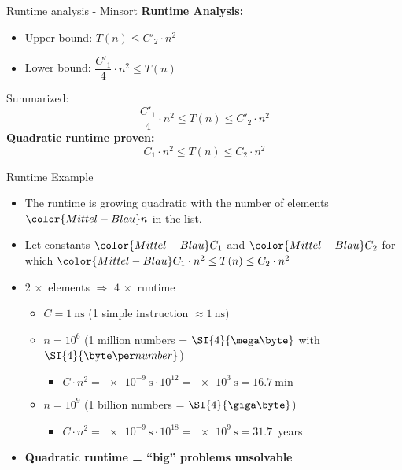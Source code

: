 \begin{frame}{Runtime analysis - Minsort}
  \textbf{Runtime Analysis:}
  \begin{itemize}
    \item
      {\color{MainB}Upper bound}:
      \hspace{1.5em} $T(n) \leq C'_2 \cdot n^2$
    \item
      {\color{MainB}Lower bound}:
      \hspace{1.5em} $\dfrac{C'_1}{4} \cdot n^2 \leq T(n)$
  \end{itemize}
  \begin{block}{Summarized:}
    \begin{displaymath}
      \frac{C'_1}{4} \cdot n^2 \leq T(n) \leq C'_2 \cdot n^2
    \end{displaymath}
    \textbf{Quadratic runtime proven:}
    \begin{displaymath}
      C_1 \cdot n^2 \leq T(n) \leq C_2 \cdot n^2
    \end{displaymath}
  \end{block}
\end{frame}


\begin{frame}{Runtime Example}
  \begin{itemize}
    \item
      The runtime is growing quadratic with the number of elements
      ${\color{Mittel-Blau}n}$ in the list.\\
    \item
      Let constants $\color{Mittel-Blau}C_1$ and $\color{Mittel-Blau}C_2$
      for which $\color{Mittel-Blau}C_1 \cdot n^2 \leq T(n) \leq C_2 \cdot n^2$
    \item
      $2\, \times$ elements $\Rightarrow$ $4\, \times$ runtime\\
      \begin{itemize}
        \item
          $C = \SI{1}{\nano\second}$
          (1 simple instruction $\approx \SI{1}{\nano\second}$)
        \item
          $n = 10^6$ (1 million numbers = $\SI{4}{\mega\byte}$
          with $\SI{4}{\byte\per number}$)
          \begin{itemize}
            \item
              $C \cdot n^2 = \SI{e-9}{\second} \cdot 10^{12}
              = \SI{e3}{\second} = \SI{16.7}{\minute}$
          \end{itemize}
        \item
          $n = 10^9$ (1 billion numbers = $\SI{4}{\giga\byte}$)
          \begin{itemize}
            \item
              $C \cdot n^2 = \SI{e-9}{\second} \cdot 10^{18}
              = \SI{e9}{\second} = 31.7$~years
          \end{itemize}
      \end{itemize}
    \item
      \textbf{Quadratic runtime = \enquote{big} problems unsolvable}
  \end{itemize}
\end{frame}
